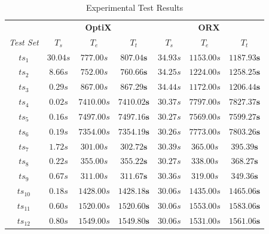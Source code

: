 \begin{table}[h]
    \centering
  \footnotesize
  \begin{tabular}{|c|ccc|ccc|}
    \hline
    &  \multicolumn{3}{c|}{\textbf{\large{OptiX}}} & \multicolumn{3}{c|}{\textbf{\large{ORX}}}\\
    \emph{Test Set} & \emph{$T_s$} & \emph{$T_e$} & \emph{$T_t$} & \emph{$T_s$} & \emph{$T_e$} & \emph{$T_t$}\\
    \hline
    $ts_{1}$   &   $30.04s$    &   $777.00s$     &   $\mathbf{807.04s}$     &   $34.93s$    &   $1153.00s$   &   $\mathbf{1187.93s}$ \\
    $ts_{2}$   &   $8.66s$     &   $752.00s$     &   $\mathbf{760.66s}$     &   $34.25s$    &   $1224.00s$   &   $\mathbf{1258.25s}$ \\
    $ts_{3}$   &   $0.29s$     &   $867.00s$     &   $\mathbf{867.29s}$     &   $34.44s$    &   $1172.00s$   &   $\mathbf{1206.44s}$ \\
    \hline
    $ts_{4}$   &   $0.02s$     &   $7410.00s$    &   $\mathbf{7410.02s}$    &   $30.37s$    &   $7797.00s$   &   $\mathbf{7827.37s}$ \\
    $ts_{5}$   &   $0.16s$     &   $7497.00s$    &   $\mathbf{7497.16s}$    &   $30.27s$    &   $7569.00s$   &   $\mathbf{7599.27s}$ \\
    $ts_{6}$   &   $0.19s$     &   $7354.00s$    &   $\mathbf{7354.19s}$    &   $30.26s$    &   $7773.00s$   &   $\mathbf{7803.26s}$ \\
    \hline
    $ts_{7}$   &   $1.72s$     &   $301.00s$     &   $\mathbf{302.72s}$     &   $30.39s$    &   $365.00s$    &   $\mathbf{395.39s}$  \\
    $ts_{8}$   &   $0.22s$     &   $355.00s$     &   $\mathbf{355.22s}$     &   $30.27s$    &   $338.00s$    &   $\mathbf{368.27s}$  \\
    $ts_{9}$   &   $0.67s$     &   $311.00s$     &   $\mathbf{311.67s}$     &   $30.36s$    &   $319.00s$    &   $\mathbf{349.36s}$  \\
    \hline
    $ts_{10}$  &   $0.18s$     &   $1428.00s$    &   $\mathbf{1428.18s}$    &   $30.06s$    &   $1435.00s$   &   $\mathbf{1465.06s}$ \\
    $ts_{11}$  &   $0.60s$     &   $1520.00s$    &   $\mathbf{1520.60s}$    &   $30.06s$    &   $1553.00s$   &   $\mathbf{1583.06s}$ \\
    $ts_{12}$  &   $0.80s$     &   $1549.00s$    &   $\mathbf{1549.80s}$    &   $30.06s$    &   $1531.00s$   &   $\mathbf{1561.06s}$\\
    \hline
  \end{tabular}
  \caption{Experimental Test Results}
  \label{test_results}
\end{table}

